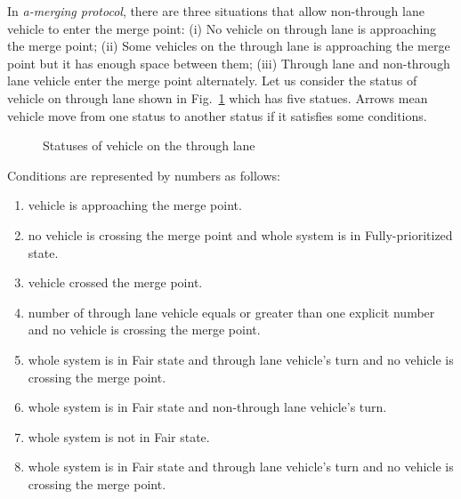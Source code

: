 \documentclass[10pt, conference, compsocconf]{IEEEtran}
\begin{document}

In \textit{a-merging protocol}, there are three situations that allow non-through lane vehicle to enter the merge point: 
(i) No vehicle on through lane is approaching the merge point; 
(ii) Some vehicles on the through lane is approaching the merge point but it has enough space between them; 
(iii) Through lane and non-through lane vehicle enter the merge point alternately. 
Let us consider the status of vehicle on through lane shown in Fig.~\ref{throughLaneStatus} which has five statues. 
Arrows mean vehicle move from one status to another status if it satisfies some conditions.

\begin{figure}[h]
\begin{center}
\end{center}
\caption{Statuses of vehicle on the through lane}
\label{throughLaneStatus}
\end{figure}

Conditions are represented by numbers as follows:
\begin{enumerate}[]
    \item vehicle is approaching the merge point. %
    \item no vehicle is crossing the merge point and whole system is in Fully-prioritized state. %
    \item vehicle crossed the merge point. %
    \item number of through lane vehicle equals or greater than one explicit number and no vehicle is crossing the merge point.  %
    \item whole system is in Fair state and through lane vehicle's turn and no vehicle is crossing the merge point. %
    \item whole system is in Fair state and non-through lane vehicle's turn. %
    \item whole system is not in Fair state. %
    \item whole system is in Fair state and through lane vehicle's turn and no vehicle is crossing the merge point. %
\end{enumerate}
\end{document}

